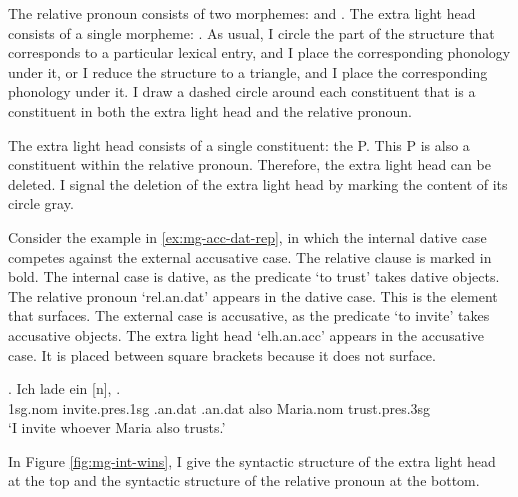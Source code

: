 The relative pronoun consists of two morphemes:  and .
The extra light head consists of a single morpheme: .
As usual, I circle the part of the structure that corresponds to a particular lexical entry, and I place the corresponding phonology under it, or I reduce the structure to a triangle, and I place the corresponding phonology under it.
I draw a dashed circle around each constituent that is a constituent in both the extra light head and the relative pronoun.

The extra light head consists of a single constituent: the P.
This P is also a constituent within the relative pronoun. Therefore, the extra light head can be deleted. I signal the deletion of the extra light head by marking the content of its circle gray.

Consider the example in \ref{ex:mg-acc-dat-rep}, in which the internal dative case competes against the external accusative case. The relative clause is marked in bold.
The internal case is dative, as the predicate  `to trust' takes dative objects. The relative pronoun  `\ac{rel}.\ac{an}.\ac{dat}' appears in the dative case. This is the element that surfaces.
The external case is accusative, as the predicate  `to invite' takes accusative objects. The extra light head  `\ac{elh}.\ac{an}.\ac{acc}' appears in the accusative case. It is placed between square brackets because it does not surface.

\exg. Ich {lade ein} [n],    .\\
1\ac{sg}.\ac{nom} invite.\ac{pres}.1\ac{sg}\scsub{[acc]} .\ac{an}.\ac{dat} .\ac{an}.\ac{dat} also Maria.\ac{nom} trust.\ac{pres}.3\ac{sg}\scsub{[dat]}\\
`I invite whoever Maria also trusts.' \label{ex:mg-acc-dat-rep}

In Figure \ref{fig:mg-int-wins}, I give the syntactic structure of the extra light head at the top and the syntactic structure of the relative pronoun at the bottom.

